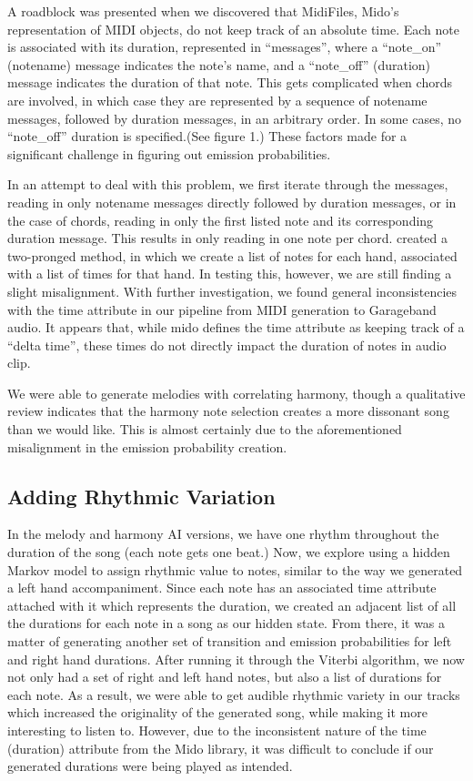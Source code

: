 \documentclass{article}
\begin{document}
\par A roadblock was presented when we discovered that MidiFiles, Mido’s representation of MIDI objects, do not keep track of an absolute time. Each note is associated with its duration, represented in “messages”, where a “note\_on” (notename) message indicates the note’s name, and a “note\_off” (duration) message indicates the duration of that note. This gets complicated when chords are involved, in which case they are represented by a sequence of notename messages, followed by duration messages, in an arbitrary order. In some cases, no “note\_off” duration is specified.(See figure 1.) These factors made for a significant challenge in figuring out emission probabilities. 
\par In an attempt to deal with this problem, we first iterate through the messages, reading in only notename messages directly followed by duration messages, or in the case of chords, reading in only the first listed note and its corresponding duration message. This results in only reading in one note per chord. created a two-pronged method, in which we create a list of notes for each hand, associated with a list of times for that hand. In testing this, however, we are still finding a slight misalignment. With further investigation, we found general inconsistencies with the time attribute in our pipeline from MIDI generation to Garageband audio. It appears that, while mido \cite{midodoc} defines the time attribute as keeping track of a “delta time”, these times do not directly impact the duration of notes in audio clip. 
\par We were able to generate melodies with correlating harmony, though a qualitative review indicates that the harmony note selection creates a more dissonant song than we would like. This is almost certainly due to the aforementioned misalignment in the emission probability creation. 


\subsection{Adding Rhythmic Variation}
 In the melody and harmony AI versions, we have one rhythm throughout the duration of the song (each note gets one beat.) Now, we explore using a hidden Markov model to assign rhythmic value to notes, similar to the way we generated a left hand accompaniment. Since each note has an associated time attribute attached with it which represents the duration, we created an adjacent list of all the durations for each note in a song as our hidden state. From there, it was a matter of generating another set of transition and emission probabilities for left and right hand durations. After running it through the Viterbi algorithm, we now not only had a set of right and left hand notes, but also a list of durations for each note. As a result, we were able to get audible rhythmic variety in our tracks which increased the originality of the generated song, while making it more interesting to listen to. However, due to the inconsistent nature of the time (duration) attribute from the Mido library, it was difficult to conclude if our generated durations were being played as intended.
 
\end{document}
